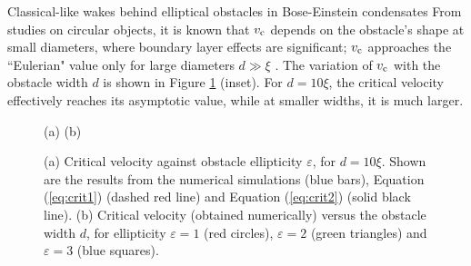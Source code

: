 \begin{chapter}{\label{cha:wake}Classical-like wakes behind elliptical obstacles in Bose-Einstein condensates}
From studies on circular objects, it is known that $v_{\rm c}$ depends on the obstacle's shape at small diameters, where boundary layer effects are significant; $v_{\rm c}$ approaches the ``Eulerian" value only for large diameters $d \gg \xi$ \cite{huepe00,rica2001}.  The variation of $v_{\rm c}$ with the obstacle width $d$ is shown in Figure \ref{fig:velplots} (inset).  For $d=10\xi$, the critical velocity effectively reaches its asymptotic value, while at smaller widths, it is much larger.   
\begin{figure}[!ht]
\hspace{0.7cm}(a)\hspace{7cm} (b)
\begin{center}
\end{center}
\caption{\label{fig:velplots}(a) Critical velocity against obstacle ellipticity $\varepsilon$, for $d=10\xi$.  Shown are the results from the numerical simulations (blue bars), Equation (\ref{eq:crit1}) (dashed red line) and Equation (\ref{eq:crit2}) (solid black line). (b) Critical velocity (obtained numerically) versus the obstacle width $d$, for ellipticity $\varepsilon=1$ (red circles), $\varepsilon=2$ (green triangles) and $\varepsilon=3$ (blue squares).
}
\end{figure} 


\end{chapter}
